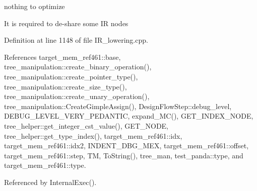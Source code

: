 nothing to optimize

It is required to de-\/share some IR nodes 

Definition at line 1148 of file I\+R\+\_\+lowering.\+cpp.



References target\+\_\+mem\+\_\+ref461\+::base, tree\+\_\+manipulation\+::create\+\_\+binary\+\_\+operation(), tree\+\_\+manipulation\+::create\+\_\+pointer\+\_\+type(), tree\+\_\+manipulation\+::create\+\_\+size\+\_\+type(), tree\+\_\+manipulation\+::create\+\_\+unary\+\_\+operation(), tree\+\_\+manipulation\+::\+Create\+Gimple\+Assign(), Design\+Flow\+Step\+::debug\+\_\+level, D\+E\+B\+U\+G\+\_\+\+L\+E\+V\+E\+L\+\_\+\+V\+E\+R\+Y\+\_\+\+P\+E\+D\+A\+N\+T\+IC, expand\+\_\+\+M\+C(), G\+E\+T\+\_\+\+I\+N\+D\+E\+X\+\_\+\+N\+O\+DE, tree\+\_\+helper\+::get\+\_\+integer\+\_\+cst\+\_\+value(), G\+E\+T\+\_\+\+N\+O\+DE, tree\+\_\+helper\+::get\+\_\+type\+\_\+index(), target\+\_\+mem\+\_\+ref461\+::idx, target\+\_\+mem\+\_\+ref461\+::idx2, I\+N\+D\+E\+N\+T\+\_\+\+D\+B\+G\+\_\+\+M\+EX, target\+\_\+mem\+\_\+ref461\+::offset, target\+\_\+mem\+\_\+ref461\+::step, TM, To\+String(), tree\+\_\+man, test\+\_\+panda\+::type, and target\+\_\+mem\+\_\+ref461\+::type.



Referenced by Internal\+Exec().

